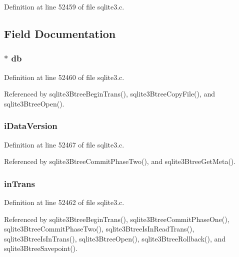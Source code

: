Definition at line 52459 of file sqlite3.\+c.



\subsection{Field Documentation}
\hypertarget{struct_btree_ad6e663497d2c934364b3bcf07496b30b}{}
\subsubsection[{db}]{$\ast$ db}\label{struct_btree_ad6e663497d2c934364b3bcf07496b30b}


Definition at line 52460 of file sqlite3.\+c.



Referenced by sqlite3\+Btree\+Begin\+Trans(), sqlite3\+Btree\+Copy\+File(), and sqlite3\+Btree\+Open().

\hypertarget{struct_btree_a3a60e67667c7473065ef0c3a8785c6ea}{}
\subsubsection[{i\+Data\+Version}]{ i\+Data\+Version}\label{struct_btree_a3a60e67667c7473065ef0c3a8785c6ea}


Definition at line 52467 of file sqlite3.\+c.



Referenced by sqlite3\+Btree\+Commit\+Phase\+Two(), and sqlite3\+Btree\+Get\+Meta().

\hypertarget{struct_btree_a2c8099ca044cfb9efe8e8f1868335882}{}
\subsubsection[{in\+Trans}]{ in\+Trans}\label{struct_btree_a2c8099ca044cfb9efe8e8f1868335882}


Definition at line 52462 of file sqlite3.\+c.



Referenced by sqlite3\+Btree\+Begin\+Trans(), sqlite3\+Btree\+Commit\+Phase\+One(), sqlite3\+Btree\+Commit\+Phase\+Two(), sqlite3\+Btree\+Is\+In\+Read\+Trans(), sqlite3\+Btree\+Is\+In\+Trans(), sqlite3\+Btree\+Open(), sqlite3\+Btree\+Rollback(), and sqlite3\+Btree\+Savepoint().

